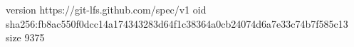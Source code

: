 version https://git-lfs.github.com/spec/v1
oid sha256:fb8ac550f0dcc14a174343283d64f1c38364a0cb24074d6a7e33c74b7f585c13
size 9375
